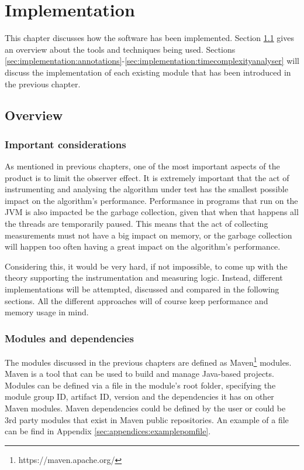 \chapter{Implementation}

This chapter discusses how the software has been implemented. Section \ref{sec:implementation:overview} gives an overview about the tools and techniques being used. Sections \ref{sec:implementation:annotations}-\ref{sec:implementation:timecomplexityanalyser} will discuss the implementation of each existing module that has been introduced in the previous chapter.

\section{Overview}
\label{sec:implementation:overview}

\subsection{Important considerations}
As mentioned in previous chapters, one of the most important aspects of the product is to limit the observer effect. It is extremely important that the act of instrumenting and analysing the algorithm under test has the smallest possible impact on the algorithm's performance. Performance in programs that run on the JVM is also impacted be the garbage collection, given that when that happens all the threads are temporarily paused. This means that the act of collecting measurements must not have a big impact on memory, or the garbage collection will happen too often having a great impact on the algorithm's performance.

\noindent Considering this, it would be very hard, if not impossible, to come up with the theory supporting the instrumentation and measuring logic. Instead, different implementations will be attempted, discussed and compared in the following sections. All the different approaches will of course keep performance and memory usage in mind.

\subsection{Modules and dependencies}
The modules discussed in the previous chapters are defined as Maven\footnote{https://maven.apache.org/} modules. Maven is a tool that can be used to build and manage Java-based projects. Modules can be defined via a  file in the module's root folder, specifying the module group ID, artifact ID, version and the dependencies it has on other Maven modules. Maven dependencies could be defined by the user or could be 3rd party modules that exist in Maven public repositories. An example of a  file can be find in Appendix \ref{sec:appendices:examplepomfile}.

